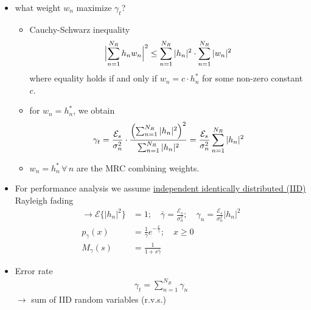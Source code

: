\documentclass[a4paper, 10pt]{article}
\begin{document}
\begin{itemize}
	\item what weight \begin{math}w_n\end{math} maximize \begin{math}\gamma _t\end{math}?
	\begin{itemize}
		\item Cauchy-Schwarz inequality
		\begin{align*}
			\Bigl | \sum_{n = 1}^{N_R}h_nw_n\Bigr |^2 \leq \sum_{n = 1}^{N_R}|h_n|^2 \cdot \sum_{n = 1}^{N_R}|w_n|^2
		\end{align*}
	where equality holds if and only if \begin{math}w_n = c\cdot h_n^*\end{math} for some non-zero constant \begin{math}c\end{math}.
		\item for \begin{math}w_n = h_n^*\end{math}, we obtain
		\begin{align*}
			\gamma _t = \frac{\mathcal{E}_s}{\sigma _n^2}\cdot \frac{\Bigl ( \sum_{n = 1}^{N_R}|h_n|^2\Bigr ) ^2}{\sum_{n = 1}^{N_R}|h_n|^2} = \frac{\mathcal{E}_s}{\sigma _n^2}\sum_{n = 1}^{N_R}|h_n|^2
		\end{align*}
		\item \begin{math}w_n = h_n^*\, \forall \, n\end{math} are the MRC combining weights.	
	\end{itemize}
	\item For performance analysis we assume \underline{independent identically distributed (IID)} Rayleigh fading
		\begin{align*}
			\rightarrow \mathcal{E}\{|h_n|^2\} &= 1; \quad \bar{\gamma} = \frac{\mathcal{E}_s}{\sigma	_n^2}; \quad \gamma _n = \frac{\mathcal{E}_s}{\sigma _n^2}|h_n|^2\\
			p_{\gamma}(x) &= \frac{1}{\bar{\gamma}}e^{-\frac{x}{\bar{\gamma}}}; \quad x\geq 0\\
			M_{\gamma}(s) &= \frac{1}{1+s\bar{\gamma}}
		\end{align*}		
	\item Error rate
			\begin{align*}
				\gamma _t = \sum_{n = 1}^{N_R}\gamma _n
			\end{align*}
			\begin{math}\rightarrow \end{math} sum of IID random variables (r.v.s.)

\end{itemize}
\end{document}
